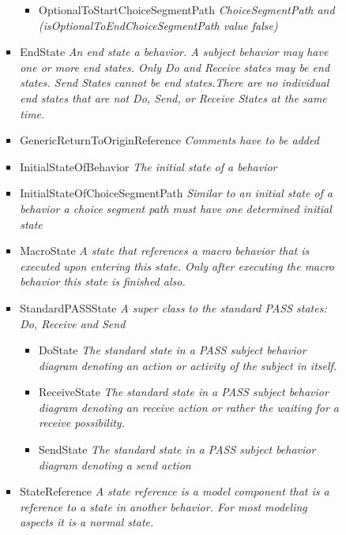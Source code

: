 \begin{itemize}
\begin{itemize}
\begin{itemize}
\begin{itemize}
\begin{itemize}
				\item OptionalToStartChoiceSegmentPath \linebreak \textit{ChoiceSegmentPath and (isOptionalToEndChoiceSegmentPath value false)}
			\end{itemize}
			\item EndState \linebreak \textit{An end state a behavior. A subject behavior may have one or more end states. Only Do and Receive states may be end states. Send States cannot be end states.There are no individual end states that are not Do, Send, or Receive States at the same time.}
			\item GenericReturnToOriginReference \linebreak \textit{Comments have to be added}
			\item InitialStateOfBehavior \linebreak \textit{The initial state of a behavior}
			\item InitialStateOfChoiceSegmentPath \linebreak \textit{Similar to an initial state of a behavior a choice segment path must have one determined initial state}
			\item MacroState \linebreak \textit{A state that references a macro behavior that is executed upon entering this state. Only after executing the macro behavior this state is finished also.}
			\item StandardPASSState \linebreak \textit{A super class to the standard PASS states: Do, Receive and Send}
			\begin{itemize}
				\item DoState \linebreak \textit{The standard state in a PASS subject behavior diagram denoting an action or activity of the subject in itself.}
				\item ReceiveState \linebreak \textit{The standard state in a PASS subject behavior diagram denoting an receive action or rather the waiting for a receive possibility.}
				\item SendState \linebreak \textit{The standard state in a PASS subject behavior diagram denoting a send action}
			\end{itemize}
			\item StateReference \linebreak \textit{A state reference is a model component that is a reference to a state in another behavior. For most modeling aspects it is a normal state.}

\end{itemize}
\end{itemize}
\end{itemize}
\end{itemize}
